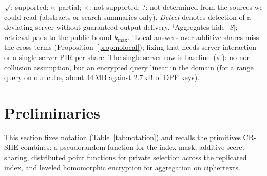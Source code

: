 \documentclass[a4paper,fleqn]{cas-sc}
\providecommand{\checkmark}{\ensuremath{\surd}}
\begin{document}
\begin{table}[pos=t,width=\textwidth]
\begin{tabular*}{\tblwidth}{@{\extracolsep{\fill}}lcccccccc@{}}
\bottomrule
\end{tabular*}
\vspace{3pt}
\begin{flushleft}
\footnotesize
$\checkmark$: supported; $\circ$: partial; $\times$: not supported; ?: not
determined from the sources we could read (abstracts or search summaries
only).
\emph{Detect} denotes detection of a deviating server without guaranteed
output delivery. $^{\dagger}$Aggregates hide $|S|$; retrieval pads to the
public bound $k_{\max}$. $^{\ddagger}$Local answers over additive shares miss
the cross terms (Proposition~\ref{prop:nolocal}); fixing that needs server
interaction or a single-server PIR per share. The single-server row is
baseline~(vi): no non-collusion assumption, but an encrypted query linear in
the domain (for a range query on our cube, about $44$\,MB against $2.7$\,kB of
DPF keys).
\end{flushleft}
\end{table}

\section{Preliminaries}
\label{sec:prelim}

This section fixes notation (Table~\ref{tab:notation}) and recalls the
primitives CR-SHE combines: a pseudorandom function for the index mask,
additive secret sharing, distributed point functions for private selection
across the replicated index, and leveled homomorphic encryption for
aggregation on ciphertexts.
\end{document}
